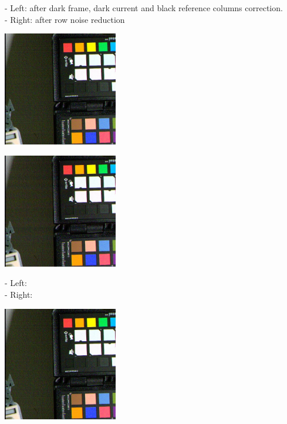 - Left: after dark frame, dark current and black reference columns correction.\\
- Right: after row noise reduction  \\

\begin{center}
\includegraphics[height=5cm]{images/10ms+4-crop}
\end{center}

\begin{center}
\includegraphics[height=5cm]{images/10ms+4-fixrn-crop}
\end{center}

- Left:  \\
- Right:  \\

\begin{center}
\includegraphics[height=5cm]{images/10ms+4-rnfilter1-crop}
\end{center}

